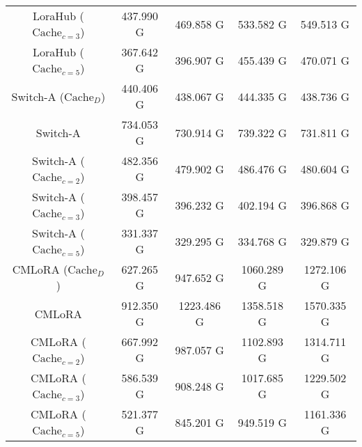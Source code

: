 \begin{table}[H]
\begin{center}
\begin{tabular}{c|cccc}
LoraHub ($\text{Cache}_{c=3}$) & 437.990 G  & 469.858 G  & 533.582 G  & 549.513 G  \\
LoraHub ($\text{Cache}_{c=5}$) & 367.642 G  & 396.907 G  & 455.439 G  & 470.071 G  \\
\midrule
Switch-A ($\text{Cache}_{D}$) & 440.406 G  & 438.067 G  & 444.335 G  & 438.736 G  \\
Switch-A & 734.053 G  & 730.914 G  & 739.322 G  & 731.811 G  \\
Switch-A ($\text{Cache}_{c=2}$)& 482.356 G  & 479.902 G  & 486.476 G  & 480.604 G \\
Switch-A ($\text{Cache}_{c=3}$)& 398.457 G  & 396.232 G  & 402.194 G  & 396.868 G \\
Switch-A ($\text{Cache}_{c=5}$)& 331.337 G  & 329.295 G  & 334.768 G  & 329.879 G \\
CMLoRA ($\text{Cache}_{D}$) & 627.265 G  & 947.652 G  & 1060.289 G  & 1272.106 G \\
CMLoRA & 912.350 G  & 1223.486 G  & 1358.518 G  & 1570.335 G  \\
CMLoRA ($\text{Cache}_{c=2}$) & 667.992 G  & 987.057 G  & 1102.893 G & 1314.711 G  \\
CMLoRA ($\text{Cache}_{c=3}$) & 586.539 G  & 908.248 G  & 1017.685 G  & 1229.502 G  \\
CMLoRA ($\text{Cache}_{c=5}$) & 521.377 G  & 845.201 G  & 949.519 G  & 1161.336 G  \\
\bottomrule
\end{tabular}
\end{center}
\end{table}
